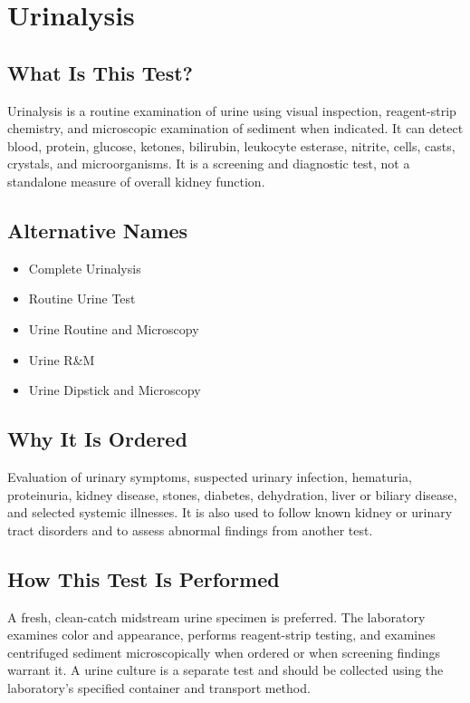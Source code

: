 \chapter{Urinalysis}

\section*{What Is This Test?}
Urinalysis is a routine examination of urine using visual inspection, reagent-strip chemistry, and microscopic examination of sediment when indicated. It can detect blood, protein, glucose, ketones, bilirubin, leukocyte esterase, nitrite, cells, casts, crystals, and microorganisms. It is a screening and diagnostic test, not a standalone measure of overall kidney function.

\section*{Alternative Names}
\begin{itemize}
  \item Complete Urinalysis
  \item Routine Urine Test
  \item Urine Routine and Microscopy
  \item Urine R\&M
  \item Urine Dipstick and Microscopy
\end{itemize}
\section*{Why It Is Ordered}
Evaluation of urinary symptoms, suspected urinary infection, hematuria, proteinuria, kidney disease, stones, diabetes, dehydration, liver or biliary disease, and selected systemic illnesses. It is also used to follow known kidney or urinary tract disorders and to assess abnormal findings from another test.

\section*{How This Test Is Performed}
A fresh, clean-catch midstream urine specimen is preferred. The laboratory examines color and appearance, performs reagent-strip testing, and examines centrifuged sediment microscopically when ordered or when screening findings warrant it. A urine culture is a separate test and should be collected using the laboratory's specified container and transport method.

